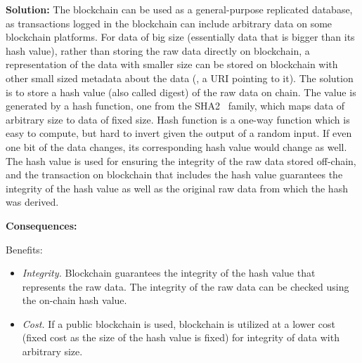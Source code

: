 \vspace{0.5em}\noindent \textbf{Solution:} The blockchain can be used as a general-purpose replicated database, as transactions logged in the blockchain can include arbitrary data on some blockchain platforms. For data of big size (essentially data that is bigger than its hash value), rather than storing the raw data directly on blockchain, a representation of the data with smaller size can be stored on blockchain with other small sized metadata about the data (\eg, a URI pointing to it). The solution is to store a hash value (also called digest) of the raw data on chain. The value is generated by a hash function, \eg one from the SHA2~\cite{SHA2} family, which maps data of arbitrary size to data of fixed size. Hash function is a one-way function which is easy to compute, but hard to invert given the output of a random input. If even one bit of the data changes, its corresponding hash value would change as well. The hash value is used for ensuring the integrity of the raw data stored off-chain, and the transaction on blockchain that includes the hash value guarantees the integrity of the hash value as well as the original raw data from which the hash was derived. 


\vspace{0.5em}\noindent \textbf{Consequences:} 

Benefits:
\begin{itemize}
  \item \textit{Integrity.} Blockchain guarantees the integrity of the hash value that represents the raw data. The integrity of the raw data can be checked using the on-chain hash value.
  \item \textit{Cost.} If a public blockchain is used, blockchain is utilized at a lower cost (fixed cost as the size of the hash value is fixed) for integrity of data with arbitrary size.
\end{itemize}

